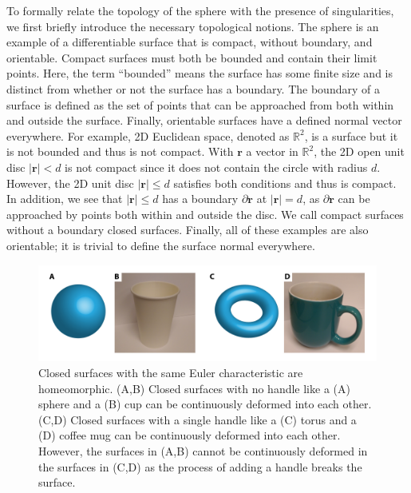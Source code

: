 To formally relate the topology of the sphere with the presence of singularities, we first briefly introduce the necessary topological notions.
The sphere is an example of a differentiable surface that is compact, without boundary, and orientable.
Compact surfaces must both be bounded and contain their limit points.
Here, the term ``bounded'' means the surface has some finite size and is distinct from whether or not the surface has a boundary.
The boundary of a surface is defined as the set of points that can be approached from both within and outside the surface.
Finally, orientable surfaces have a defined normal vector everywhere.
For example, 2D Euclidean space, denoted as $\mathbb{R}^2$, is a surface but it is not bounded and thus is not compact.
With $\mathbf{r}$ a vector in $\mathbb{R}^2$, the 2D open unit disc $|\mathbf{r}| < d$ is not compact since it does not contain the circle with radius $d$.
However, the 2D unit disc $|\mathbf{r}| \leq d$ satisfies both conditions and thus is compact.
In addition, we see that $|\mathbf{r}| \leq d$ has a boundary $\partial \mathbf{r}$ at $|\mathbf{r}| = d$, as $\partial \mathbf{r}$ can be approached by points both within and outside the disc.
We call compact surfaces without a boundary closed surfaces.
Finally, all of these examples are also orientable; it is trivial to define the surface normal everywhere.
\begin{figure}
  \centering
  \includegraphics{figures/C1/Ch1-Figs_ChiObjects.png}
  \caption{Closed surfaces with the same Euler characteristic are homeomorphic. (A,B) Closed surfaces with no handle like a (A) sphere and a (B) cup can be continuously deformed into each other.
  (C,D) Closed surfaces with a single handle like a (C) torus and a (D) coffee mug can be continuously deformed into each other.
  However, the surfaces in (A,B) cannot be continuously deformed in the surfaces in (C,D) as the process of adding a handle breaks the surface.}\label{f:1-ChiObjects}
\end{figure}

